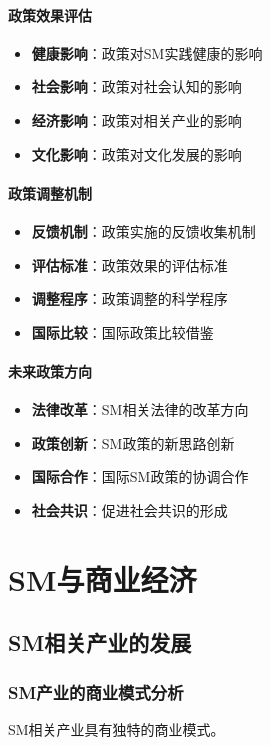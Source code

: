 \documentclass[12pt,UTF8]{ctexbook}
\begin{document}
\subsection{政策效果评估}
\begin{itemize}[leftmargin=2cm]
	\item \textbf{健康影响}：政策对SM实践健康的影响
	\item \textbf{社会影响}：政策对社会认知的影响
	\item \textbf{经济影响}：政策对相关产业的影响
	\item \textbf{文化影响}：政策对文化发展的影响
\end{itemize}

\subsection{政策调整机制}
\begin{itemize}[leftmargin=2cm]
	\item \textbf{反馈机制}：政策实施的反馈收集机制
	\item \textbf{评估标准}：政策效果的评估标准
	\item \textbf{调整程序}：政策调整的科学程序
	\item \textbf{国际比较}：国际政策比较借鉴
\end{itemize}

\subsection{未来政策方向}
\begin{itemize}[leftmargin=2cm]
	\item \textbf{法律改革}：SM相关法律的改革方向
	\item \textbf{政策创新}：SM政策的新思路创新
	\item \textbf{国际合作}：国际SM政策的协调合作
	\item \textbf{社会共识}：促进社会共识的形成
\end{itemize}

\part{SM与商业经济}

\chapter{SM相关产业的发展}
\section{SM产业的商业模式分析}
SM相关产业具有独特的商业模式。
\end{document}
